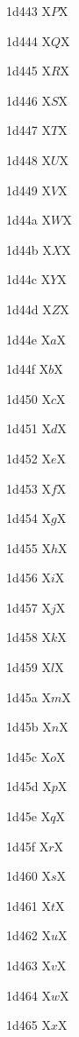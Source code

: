 \documentclass[11pt]{article}
\begin{document}
1d443 X{\ensuremath{\mathit{P}}}X

1d444 X{\ensuremath{\mathit{Q}}}X

1d445 X{\ensuremath{\mathit{R}}}X

1d446 X{\ensuremath{\mathit{S}}}X

1d447 X{\ensuremath{\mathit{T}}}X

1d448 X{\ensuremath{\mathit{U}}}X

1d449 X{\ensuremath{\mathit{V}}}X

1d44a X{\ensuremath{\mathit{W}}}X

1d44b X{\ensuremath{\mathit{X}}}X

1d44c X{\ensuremath{\mathit{Y}}}X

1d44d X{\ensuremath{\mathit{Z}}}X

1d44e X{\ensuremath{\mathit{a}}}X

1d44f X{\ensuremath{\mathit{b}}}X

1d450 X{\ensuremath{\mathit{c}}}X

1d451 X{\ensuremath{\mathit{d}}}X

1d452 X{\ensuremath{\mathit{e}}}X

1d453 X{\ensuremath{\mathit{f}}}X

1d454 X{\ensuremath{\mathit{g}}}X

1d455 X{\ensuremath{\mathit{h}}}X

1d456 X{\ensuremath{\mathit{i}}}X

1d457 X{\ensuremath{\mathit{j}}}X

1d458 X{\ensuremath{\mathit{k}}}X

1d459 X{\ensuremath{\mathit{l}}}X

1d45a X{\ensuremath{\mathit{m}}}X

1d45b X{\ensuremath{\mathit{n}}}X

1d45c X{\ensuremath{\mathit{o}}}X

1d45d X{\ensuremath{\mathit{p}}}X

1d45e X{\ensuremath{\mathit{q}}}X

1d45f X{\ensuremath{\mathit{r}}}X

1d460 X{\ensuremath{\mathit{s}}}X

1d461 X{\ensuremath{\mathit{t}}}X

1d462 X{\ensuremath{\mathit{u}}}X

1d463 X{\ensuremath{\mathit{v}}}X

1d464 X{\ensuremath{\mathit{w}}}X

1d465 X{\ensuremath{\mathit{x}}}X
\end{document}
